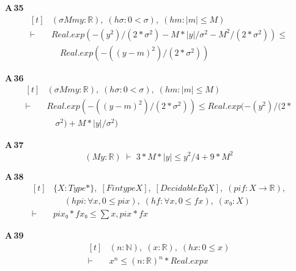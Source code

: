 \noindent\textbf{A\,35}\quad{}
{\footnotesize\[ \begin{aligned}[t]
&(\sigma \mathit{M} \mathit{m} \mathit{y} : \mathbb{R} ),\; (\mathit{hσ} : 0 < \sigma ),\; (\mathit{hm} : |\mathit{m}| \leq \mathit{M})\\
\vdash\;&\mathit{Real}.\mathit{exp} (-(\mathit{y} ^{2}) / (2 * \sigma ^{2}) - \mathit{M} * |\mathit{y}| / \sigma ^{2} - \mathit{M} ^{2} / (2 * \sigma ^{2})) \leq\\
&\quad \mathit{Real}.\mathit{exp} (-((\mathit{y} - \mathit{m}) ^{2}) / (2 * \sigma ^{2}))
\end{aligned} \]}

\noindent\textbf{A\,36}\quad{}
{\footnotesize\[ \begin{aligned}[t]
&(\sigma \mathit{M} \mathit{m} \mathit{y} : \mathbb{R} ),\; (\mathit{hσ} : 0 < \sigma ),\; (\mathit{hm} : |\mathit{m}| \leq \mathit{M})\\
\vdash\;&\mathit{Real}.\mathit{exp} (-((\mathit{y} - \mathit{m}) ^{2}) / (2 * \sigma ^{2})) \leq \mathit{Real}.\mathit{exp} (-(\mathit{y} ^{2}) / (2 *\\
&\quad \sigma ^{2}) + \mathit{M} * |\mathit{y}| / \sigma ^{2})
\end{aligned} \]}

\noindent\textbf{A\,37}\quad{}
{\footnotesize\[ (\mathit{M} \mathit{y} : \mathbb{R} ) \;\vdash\; 3 * \mathit{M} * |\mathit{y}| \leq \mathit{y} ^{2} / 4 + 9 * \mathit{M} ^{2} \]}

\noindent\textbf{A\,38}\quad{}
{\footnotesize\[ \begin{aligned}[t]
&\{ \mathit{X} : \mathit{Type}*\},\; [\mathit{Fintype} \mathit{X}],\; [\mathit{DecidableEq} \mathit{X}],\; (\mathit{pi} \mathit{f} : \mathit{X} \to \mathbb{R} ),\\
&\quad \; (\mathit{hpi} : \forall \mathit{x}, 0 \leq \mathit{pi} \mathit{x}),\; (\mathit{hf} : \forall \mathit{x}, 0 \leq \mathit{f} \mathit{x}),\; (\mathit{x₀} : \mathit{X})\\
\vdash\;&\mathit{pi} \mathit{x₀} * \mathit{f} \mathit{x₀} \leq \textstyle\sum \mathit{x}, \mathit{pi} \mathit{x} * \mathit{f} \mathit{x}
\end{aligned} \]}

\noindent\textbf{A\,39}\quad{}
{\footnotesize\[ \begin{aligned}[t]
&(\mathit{n} : \mathbb{N} ),\; (\mathit{x} : \mathbb{R} ),\; (\mathit{hx} : 0 \leq \mathit{x})\\
\vdash\;&\mathit{x} ^{\mathit{n}} \leq (\mathit{n} : \mathbb{R} ) ^{\mathit{n}} * \mathit{Real}.\mathit{exp} \mathit{x}
\end{aligned} \]}

